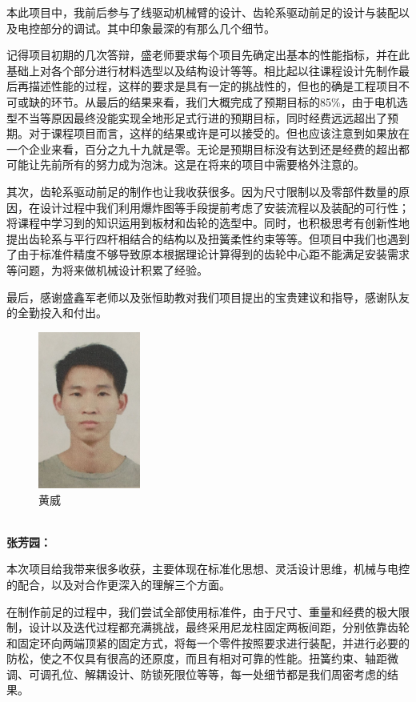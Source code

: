 \documentclass[12pt]{article}
\begin{document}
\begin{CJK}{UTF8}{song}
本此项目中，我前后参与了线驱动机械臂的设计、齿轮系驱动前足的设计与装配以及电控部分的调试。其中印象最深的有那么几个细节。\par
记得项目初期的几次答辩，盛老师要求每个项目先确定出基本的性能指标，并在此基础上对各个部分进行材料选型以及结构设计等等。相比起以往课程设计先制作最后再描述性能的过程，这样的要求是具有一定的挑战性的，但也的确是工程项目不可或缺的环节。从最后的结果来看，我们大概完成了预期目标的85$\%$，由于电机选型不当等原因最终没能实现全地形足式行进的预期目标，同时经费远远超出了预期。对于课程项目而言，这样的结果或许是可以接受的。但也应该注意到如果放在一个企业来看，百分之九十九就是零。无论是预期目标没有达到还是经费的超出都可能让先前所有的努力成为泡沫。这是在将来的项目中需要格外注意的。\par
其次，齿轮系驱动前足的制作也让我收获很多。因为尺寸限制以及零部件数量的原因，在设计过程中我们利用爆炸图等手段提前考虑了安装流程以及装配的可行性；将课程中学习到的知识运用到板材和齿轮的选型中。同时，也积极思考有创新性地提出齿轮系与平行四杆相结合的结构以及扭簧柔性约束等等。但项目中我们也遇到了由于标准件精度不够导致原本根据理论计算得到的齿轮中心距不能满足安装需求等问题，为将来做机械设计积累了经验。\par
最后，感谢盛鑫军老师以及张恒助教对我们项目提出的宝贵建议和指导，感谢队友的全勤投入和付出。
\begin{figure}[H]
\centering
\includegraphics[width=0.3\textwidth]{photo//hw.jpg}
\caption{黄威}
\end{figure}
~\\
\textbf{张芳园：}\par
本次项目给我带来很多收获，主要体现在标准化思想、灵活设计思维，机械与电控的配合，以及对合作更深入的理解三个方面。\par
在制作前足的过程中，我们尝试全部使用标准件，由于尺寸、重量和经费的极大限制，设计以及迭代过程都充满挑战，最终采用尼龙柱固定两板间距，分别依靠齿轮和固定环向两端顶紧的固定方式，将每一个零件按照要求进行装配，并进行必要的防松，使之不仅具有很高的还原度，而且有相对可靠的性能。扭簧约束、轴距微调、可调孔位、解耦设计、防锁死限位等等，每一处细节都是我们周密考虑的结果。\par

\end{CJK}
\end{document}
